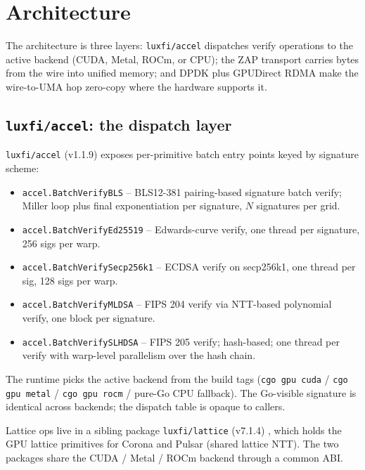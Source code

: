 \section{Architecture}
\label{sec:architecture}

The architecture is three layers: \texttt{luxfi/accel} dispatches
verify operations to the active backend (CUDA, Metal, ROCm, or
CPU); the ZAP transport carries bytes from the wire into unified
memory; and DPDK plus GPUDirect RDMA make the wire-to-UMA hop
zero-copy where the hardware supports it.

\subsection{\texttt{luxfi/accel}: the dispatch layer}

\texttt{luxfi/accel} (v1.1.9) \cite{accelmod} exposes
per-primitive batch entry points keyed by signature scheme:

\begin{itemize}[leftmargin=2em,nosep]
\item \texttt{accel.BatchVerifyBLS} -- BLS12-381 pairing-based
  signature batch verify; Miller loop plus final exponentiation
  per signature, $N$ signatures per grid.
\item \texttt{accel.BatchVerifyEd25519} -- Edwards-curve verify,
  one thread per signature, 256 sigs per warp.
\item \texttt{accel.BatchVerifySecp256k1} -- ECDSA verify on
  secp256k1, one thread per sig, 128 sigs per warp.
\item \texttt{accel.BatchVerifyMLDSA} -- FIPS 204 \cite{fips204}
  verify via NTT-based polynomial verify, one block per signature.
\item \texttt{accel.BatchVerifySLHDSA} -- FIPS 205 \cite{fips205}
  verify; hash-based; one thread per verify with warp-level
  parallelism over the hash chain.
\end{itemize}

The runtime picks the active backend from the build tags (\texttt{cgo gpu cuda} /
\texttt{cgo gpu metal} / \texttt{cgo gpu rocm} / pure-Go CPU
fallback). The Go-visible signature is identical across backends;
the dispatch table is opaque to callers.

Lattice ops live in a sibling package \texttt{luxfi/lattice}
(v7.1.4) \cite{latticemod}, which holds the GPU lattice
primitives for Corona and Pulsar (shared lattice NTT). The two
packages share the CUDA / Metal / ROCm backend through a common
ABI.


